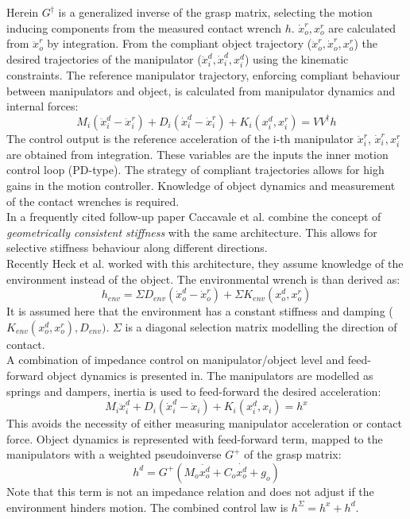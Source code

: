 \documentclass[a4paper,twoside, openright,12pt]{report}
\begin{document}
Herein $ G^\dagger $ is a generalized inverse of the grasp matrix, selecting the motion inducing components from the measured contact wrench $ h $. $ \dot{x}_o^r, x_o^r $ are calculated from $ \ddot{x}_o^r $ by integration.
From the compliant object trajectory ($ \ddot{x}_o^r,\dot{x}_o^r,x_o^r $) the desired trajectories of the manipulator ($ \ddot{x}_i^d,\dot{x}_i^d,x_i^d $) using the kinematic constraints. The reference manipulator trajectory, enforcing compliant behaviour between manipulators and object, is calculated from manipulator dynamics and internal forces: 
\begin{equation}
M_i(\ddot{x}_i^d - \ddot{x}_i^r) + D_i (\dot{x}_i^d - \dot{x}_i^r) + K_i(x_i^d,x_i^r) = VV^\dagger h
\end{equation}
The control output is the reference acceleration of the i-th manipulator $ \ddot{x}_i^r $, $ \dot{x}_i^r,x_i^r $ are obtained from integration. These variables are the inputs the inner motion control loop (PD-type). The strategy of compliant trajectories allows for high gains in the motion controller. Knowledge of object dynamics and measurement of the contact wrenches is required.\\
In a frequently cited follow-up paper Caccavale et al. \cite{Caccavale_08} combine the concept of \emph{geometrically consistent stiffness} with the same architecture. This allows for selective stiffness behaviour along different directions.\\
Recently Heck et al. \cite{Heck_13} worked with this architecture, they assume knowledge of the environment instead of the object.
The environmental wrench is than derived as:
\begin{equation}
h_{env} =  \Sigma D_{env} (\dot{x}_o^d - \dot{x}_o^r)  + \Sigma K_{env}(x_o^d,x_o^r)
\end{equation}
It is assumed here that the environment has a constant stiffness and damping ($ K_{env}(x_o^d,x_o^r),D_{env}) $. $ \Sigma $ is a diagonal selection matrix modelling the direction of contact.\\
A combination of impedance control on manipulator/object level and feed-forward object dynamics is presented in\cite{DePascali_15}. The manipulators are modelled as springs and dampers, inertia is used to feed-forward the desired acceleration: 
\begin{equation}
M_i \ddot{x}_i^d + D_i (\dot{x}_i^d - \dot{x}_i) + K_i(x_i^d,x_i) = h^x
\end{equation}
This avoids the necessity of either measuring manipulator acceleration or contact force.
Object dynamics is represented with feed-forward term, mapped to the manipulators with a weighted pseudoinverse $ G^+ $ of the grasp matrix:
\begin{equation}
h^d = G^+ (M_o \ddot{x_o^d} + C_o \dot{x_o^d} + g_o)
\end{equation}
Note that this term is not an impedance relation and does not adjust if the environment hinders motion.
The combined control law is $ h^\Sigma = h^x + h^d $.\\
 
\end{document}
